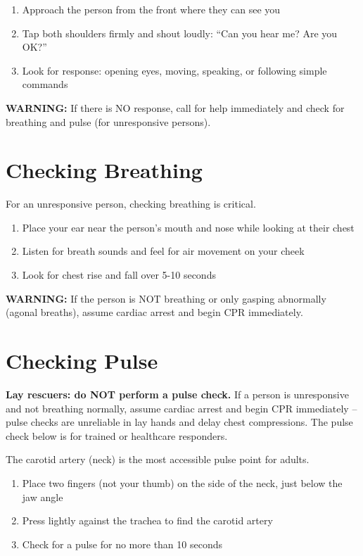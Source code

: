\begin{enumerate}[leftmargin=*]
\item Approach the person from the front where they can see you
\item Tap both shoulders firmly and shout loudly: ``Can you hear me? Are you OK?''
\item Look for response: opening eyes, moving, speaking, or following simple commands
\end{enumerate}
\textbf{WARNING:} If there is NO response, call for help immediately and check for breathing and pulse (for unresponsive persons).

\section{Checking Breathing}

For an unresponsive person, checking breathing is critical.

\begin{enumerate}[leftmargin=*]
\item Place your ear near the person's mouth and nose while looking at their chest
\item Listen for breath sounds and feel for air movement on your cheek
\item Look for chest rise and fall over 5-10 seconds
\end{enumerate}
\textbf{WARNING:} If the person is NOT breathing or only gasping abnormally (agonal breaths), assume cardiac arrest and begin CPR immediately.

\section{Checking Pulse}

\textbf{Lay rescuers: do NOT perform a pulse check.} If a person is unresponsive and not breathing normally, assume cardiac arrest and begin CPR immediately -- pulse checks are unreliable in lay hands and delay chest compressions. The pulse check below is for trained or healthcare responders.

The carotid artery (neck) is the most accessible pulse point for adults.

\begin{enumerate}[leftmargin=*]
\item Place two fingers (not your thumb) on the side of the neck, just below the jaw angle
\item Press lightly against the trachea to find the carotid artery
\item Check for a pulse for no more than 10 seconds
\end{enumerate}


